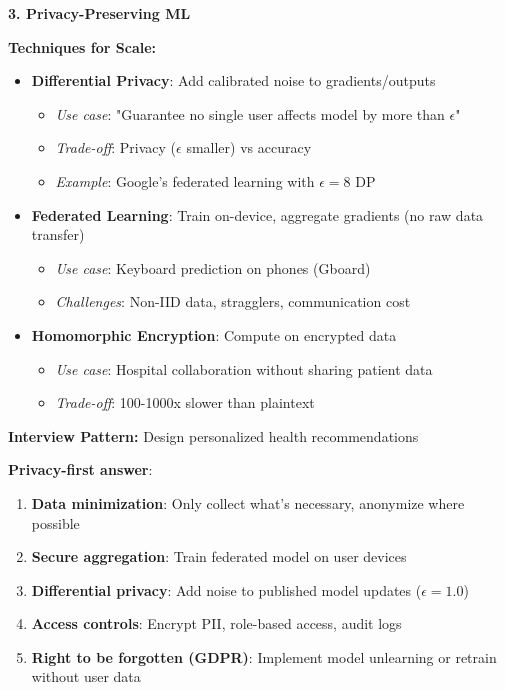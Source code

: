 \documentclass[10pt]{article}
\begin{document}
\textbf{3. Privacy-Preserving ML}

\textbf{Techniques for Scale:}
\begin{itemize}
\item \textbf{Differential Privacy}: Add calibrated noise to gradients/outputs
\begin{itemize}
\item \textit{Use case}: "Guarantee no single user affects model by more than $\epsilon$"
\item \textit{Trade-off}: Privacy ($\epsilon$ smaller) vs accuracy
\item \textit{Example}: Google's federated learning with $\epsilon=8$ DP
\end{itemize}
\item \textbf{Federated Learning}: Train on-device, aggregate gradients (no raw data transfer)
\begin{itemize}
\item \textit{Use case}: Keyboard prediction on phones (Gboard)
\item \textit{Challenges}: Non-IID data, stragglers, communication cost
\end{itemize}
\item \textbf{Homomorphic Encryption}: Compute on encrypted data
\begin{itemize}
\item \textit{Use case}: Hospital collaboration without sharing patient data
\item \textit{Trade-off}: 100-1000x slower than plaintext
\end{itemize}
\end{itemize}

\textbf{Interview Pattern:} Design personalized health recommendations

\textbf{Privacy-first answer}:
\begin{enumerate}
\item \textbf{Data minimization}: Only collect what's necessary, anonymize where possible
\item \textbf{Secure aggregation}: Train federated model on user devices
\item \textbf{Differential privacy}: Add noise to published model updates ($\epsilon=1.0$)
\item \textbf{Access controls}: Encrypt PII, role-based access, audit logs
\item \textbf{Right to be forgotten (GDPR)}: Implement model unlearning or retrain without user data
\end{enumerate}
\end{document}
